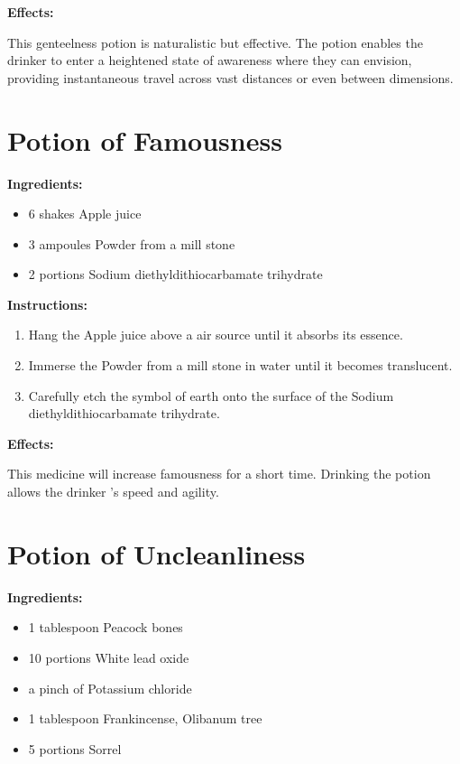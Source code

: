 \documentclass{article}
\begin{document}
\textbf{Effects:}

This genteelness potion is naturalistic but effective. The potion enables the drinker to enter a heightened state of awareness where they can envision, providing instantaneous travel across vast distances or even between dimensions.

\newpage
\section*{Potion of Famousness}

\textbf{Ingredients:}

\begin{itemize}
  \item 6 shakes Apple juice
  \item 3 ampoules Powder from a mill stone
  \item 2 portions Sodium diethyldithiocarbamate trihydrate
\end{itemize}

\textbf{Instructions:}

\begin{enumerate}
  \item Hang the Apple juice above a air source until it absorbs its essence.
  \item Immerse the Powder from a mill stone in water until it becomes translucent.
  \item Carefully etch the symbol of earth onto the surface of the Sodium diethyldithiocarbamate trihydrate.
\end{enumerate}

\textbf{Effects:}

This medicine will increase famousness for a short time. Drinking the potion allows the drinker 's speed and agility.

\newpage
\section*{Potion of Uncleanliness}

\textbf{Ingredients:}

\begin{itemize}
  \item 1 tablespoon Peacock bones
  \item 10 portions White lead oxide
  \item a pinch of Potassium chloride
  \item 1 tablespoon Frankincense, Olibanum tree
  \item 5 portions Sorrel
\end{itemize}
\end{document}
